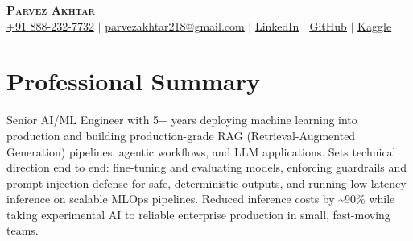 \documentclass[11pt,a4paper]{article}
\begin{document}
\begin{center}
    \textbf{\Huge \scshape Parvez Akhtar} \\ \vspace{1pt}
    \small \href{tel:+918882327732}{+91 888-232-7732} $\vert$ \href{mailto:parvezakhtar218@gmail.com}{\underline{parvezakhtar218@gmail.com}} $\vert$
    \href{https://www.linkedin.com/in/parvezakhtar/}{\underline{LinkedIn}} $\vert$
    \href{https://github.com/ipmob}{\underline{GitHub}} $\vert$
    \href{https://www.kaggle.com/parvez218}{\underline{Kaggle}}
\end{center}

\section{Professional Summary}
\small{Senior AI/ML Engineer with 5+ years deploying machine learning into production and building production-grade RAG (Retrieval-Augmented Generation) pipelines, agentic workflows, and LLM applications. Sets technical direction end to end: fine-tuning and evaluating models, enforcing guardrails and prompt-injection defense for safe, deterministic outputs, and running low-latency inference on scalable MLOps pipelines. Reduced inference costs by \textasciitilde{}90\% while taking experimental AI to reliable enterprise production in small, fast-moving teams.}

\end{document}
